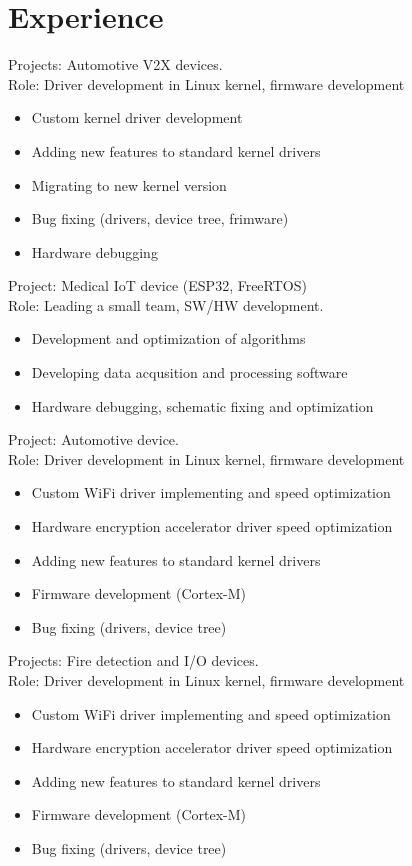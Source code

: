 \documentclass[11pt,a4paper]{moderncv}
\begin{document}
\section{Experience}
  {Projects: Automotive V2X devices.\\
    Role: Driver development in Linux kernel, firmware development
    \begin{itemize}
      \item Custom kernel driver development
      \item Adding new features to standard kernel drivers
      \item Migrating to new kernel version
      \item Bug fixing (drivers, device tree, frimware)
      \item Hardware debugging
    \end{itemize}}
  {Project: Medical IoT device (ESP32, FreeRTOS)\\
    Role: Leading a small team, SW/HW development.
    \begin{itemize}
      \item Development and optimization of algorithms
      \item Developing data acqusition and processing software
      \item Hardware debugging, schematic fixing and optimization
    \end{itemize}}
  {Project: Automotive device.\\
    Role: Driver development in Linux kernel, firmware development
    \begin{itemize}
      \item Custom WiFi driver implementing and speed optimization
      \item Hardware encryption accelerator driver speed optimization
      \item Adding new features to standard kernel drivers
      \item Firmware development (Cortex-M)
      \item Bug fixing (drivers, device tree)
    \end{itemize}}
  {Projects: Fire detection and I/O devices.\\
    Role: Driver development in Linux kernel, firmware development
    \begin{itemize}
      \item Custom WiFi driver implementing and speed optimization
      \item Hardware encryption accelerator driver speed optimization
      \item Adding new features to standard kernel drivers
      \item Firmware development (Cortex-M)
      \item Bug fixing (drivers, device tree)
    \end{itemize}}
\end{document}
